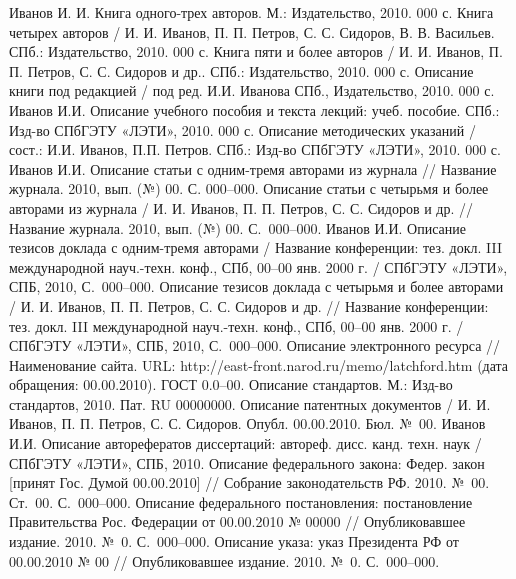 \begin{thebibliography}{99}
	\bibitem{} Иванов И. И. Книга одного-трех авторов. М.: Издательство, 2010. 000 с.
	\bibitem{} Книга четырех авторов / И. И. Иванов, П. П. Петров, С. С. Сидоров, В. В. Васильев. СПб.: Издательство, 2010. 000 с.
	\bibitem{} Книга пяти и более авторов / И. И. Иванов, П. П. Петров, С. С. Сидоров и др.. СПб.: Издательство, 2010. 000 с.
	\bibitem{} Описание книги под редакцией / под ред. И.И. Иванова СПб., Издательство, 2010. 000 с.
	\bibitem{} Иванов И.И. Описание учебного пособия и текста лекций: учеб. пособие. СПб.: Изд-во СПбГЭТУ «ЛЭТИ», 2010. 000 с.
	\bibitem{} Описание методических указаний / сост.: И.И. Иванов, П.П. Петров. СПб.: Изд-во СПбГЭТУ «ЛЭТИ», 2010. 000 с.
	\bibitem{} Иванов И.И. Описание статьи с одним-тремя авторами из журнала // Название журнала. 2010, вып. (№) 00. С. 000–000.
	\bibitem{} Описание статьи с четырьмя и более авторами из журнала / И. И. Иванов, П. П. Петров, С. С. Сидоров и др. // Название журнала. 2010, вып. (№) 00. С. 000–000.
	\bibitem{} Иванов И.И. Описание тезисов доклада с одним-тремя авторами / Название конференции: тез. докл. III международной науч.-техн. конф., СПб,  00–00 янв. 2000 г. / СПбГЭТУ «ЛЭТИ», СПБ, 2010, С. 000–000.
	\bibitem{} Описание тезисов доклада с четырьмя и более авторами / И. И. Иванов, П. П. Петров, С. С. Сидоров и др. // Название конференции: тез. докл. III международной науч.-техн. конф., СПб,  00–00 янв. 2000 г. / СПбГЭТУ «ЛЭТИ», СПБ, 2010, С. 000–000.
	\bibitem{} Описание электронного ресурса // Наименование сайта. URL: http://east-front.narod.ru/memo/latchford.htm (дата обращения: 00.00.2010).
	\bibitem{} ГОСТ 0.0–00. Описание стандартов. М.: Изд-во стандартов, 2010.
	\bibitem{} Пат. RU 00000000. Описание патентных документов / И. И. Иванов, П. П. Петров, С. С. Сидоров. Опубл. 00.00.2010. Бюл. № 00.
	\bibitem{} Иванов И.И. Описание авторефератов диссертаций: автореф. дисс. канд. техн. наук / СПбГЭТУ «ЛЭТИ», СПБ, 2010.
	\bibitem{} Описание федерального закона: Федер. закон [принят Гос. Думой 00.00.2010] // Собрание законодательств РФ. 2010. № 00. Ст. 00. С. 000–000.
	\bibitem{} Описание федерального постановления: постановление Правительства Рос. Федерации от 00.00.2010 № 00000 // Опубликовавшее издание. 2010. № 0. С. 000–000.
	\bibitem{} Описание указа: указ Президента РФ от 00.00.2010 № 00 // Опубликовавшее издание. 2010. № 0. С. 000–000.
\end{thebibliography}

